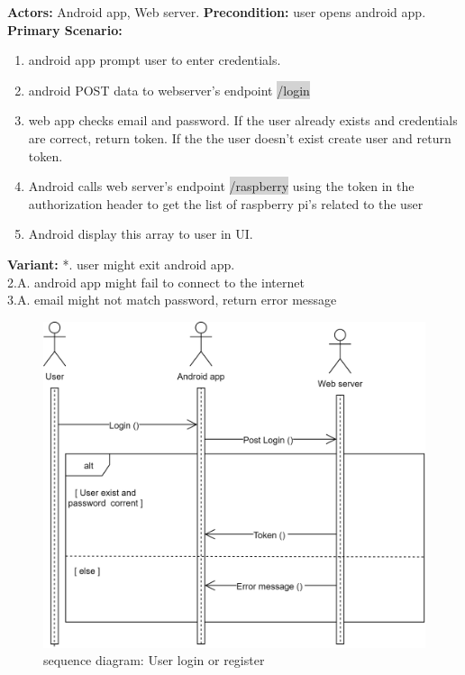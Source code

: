 \documentclass[12pt, oneside, a4paper]{book}
\newcommand{\code}[1]{{\color{red}\colorbox{lightgray}{#1}}}
\begin{document}
				\newline\textbf{Actors:} Android app, Web server.
				\newline\textbf{Precondition:} user opens android app.
				\newline\textbf{Primary Scenario:}	
				\begin{enumerate}[label*=\arabic*.]
					\item android app prompt user to enter credentials.
					\item android POST data to webserver's endpoint \code{/login} 
					\item web app checks email and password. If the user already exists and credentials are correct, return token. If the the user doesn't exist create user and return token.
					\item Android calls web server's endpoint \code{/raspberry} using the token in the authorization header to get the list of raspberry pi's related to the user
					\item Android display this array to user in UI.
				\end{enumerate}
				\textbf{Variant:}\newline
				\hspace*{5mm}*. user might exit android app. \\
				\hspace*{5mm}2.A. android app might fail to connect to the internet \\
				\hspace*{5mm}3.A. email might not match password, return error message \\
				\begin{figure}[H]
					\includegraphics[width=\linewidth]{img/sequence_user_login.png}
					\caption{sequence diagram: User login or register}
					\label{user_login}
				\end{figure}
			
\end{document}
